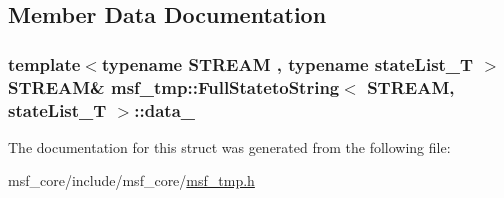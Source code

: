 \subsection{Member Data Documentation}
\hypertarget{structmsf__tmp_1_1FullStatetoString_a31ee8e0c80209164fbabafb1b37666e8}{
\subsubsection[{data\-\_\-}]{\setlength{\rightskip}{0pt plus 5cm}template$<$typename S\-T\-R\-E\-A\-M , typename state\-List\-\_\-\-T $>$ S\-T\-R\-E\-A\-M\& {\bf msf\-\_\-tmp\-::\-Full\-Stateto\-String}$<$ S\-T\-R\-E\-A\-M, state\-List\-\_\-\-T $>$\-::data\-\_\-\hspace{0.3cm}{\ttfamily [private]}}}\label{structmsf__tmp_1_1FullStatetoString_a31ee8e0c80209164fbabafb1b37666e8}


The documentation for this struct was generated from the following file\-:\begin{DoxyCompactItemize}
\item 
msf\-\_\-core/include/msf\-\_\-core/\hyperlink{msf__tmp_8h}{msf\-\_\-tmp.\-h}\end{DoxyCompactItemize}

